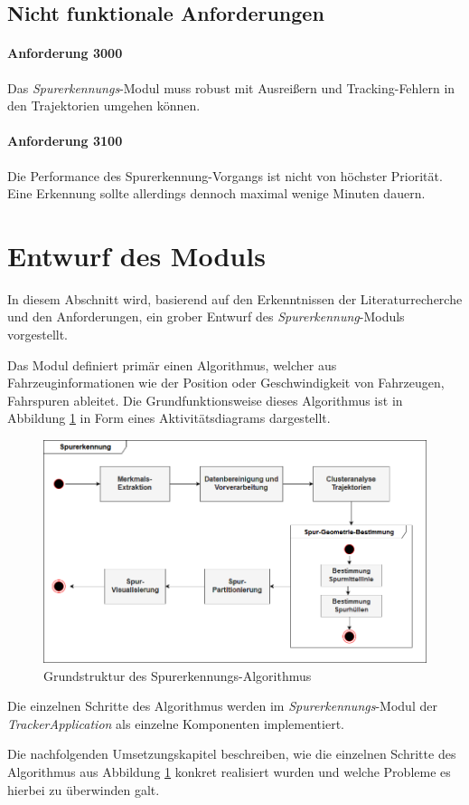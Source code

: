 \subsection{Nicht funktionale Anforderungen}

\paragraph{Anforderung 3000}
Das \textit{Spurerkennungs}-Modul muss robust mit Ausreißern und Tracking-Fehlern in den Trajektorien umgehen können.

\paragraph{Anforderung 3100}
Die Performance des Spurerkennung-Vorgangs ist nicht von höchster Priorität. Eine Erkennung sollte allerdings
dennoch maximal wenige Minuten dauern.


\section{Entwurf des Moduls}
\label{sec:design}

In diesem Abschnitt wird, basierend auf den Erkenntnissen der Literaturrecherche und den Anforderungen,
ein grober Entwurf des \textit{Spurerkennung}-Moduls vorgestellt.

Das Modul definiert primär einen Algorithmus, welcher aus Fahrzeuginformationen wie der Position
oder Geschwindigkeit von Fahrzeugen, Fahrspuren ableitet. Die Grundfunktionsweise dieses Algorithmus
ist in Abbildung \ref{fig:concept_laneDetection_activity} in Form eines Aktivitätsdiagrams dargestellt.

\begin{figure}[H]
    \centering
    \includegraphics[width=0.8\linewidth]{../resources/img/konzeption/activity_laneDetection}
    \caption{Grundstruktur des Spurerkennungs-Algorithmus}
    \label{fig:concept_laneDetection_activity}
\end{figure}

Die einzelnen Schritte des Algorithmus werden im \textit{Spurerkennungs}-Modul der \textit{TrackerApplication}
als einzelne Komponenten implementiert.

Die nachfolgenden Umsetzungskapitel beschreiben, wie die einzelnen Schritte des Algorithmus aus
Abbildung \ref{fig:concept_laneDetection_activity} konkret realisiert wurden und welche Probleme es hierbei
zu überwinden galt.
